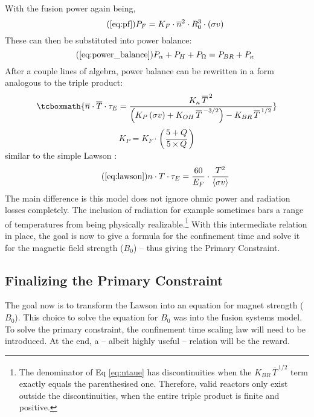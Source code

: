 With the fusion power again being,
\begin{equation}
	\tag{\ref{eq:pf}}
	P_F = K_F \cdot \overline{n}^2 \cdot R_0^3  \cdot (\sigma v)
\end{equation}
These can then be substituted into power balance:
\begin{equation}
	\tag{\ref{eq:power_balance}}
	P_\alpha + P_H + P_\Omega = P_{BR} + P_\kappa
\end{equation}
After a couple lines of algebra, power balance can be rewritten in a form analogous to the triple product:
\begin{equation}
	\label{eq:ntaue}
	\tcboxmath{
	 \overline{n}  \cdot \overline{T} \cdot \tau_E = \frac{ K_\kappa \, \overline{T}^{\,2} }{ \left( K_P \, (\sigma v) +  K_{OH} \, \overline{T}^{  \,-3/2 } \right) - K_{BR} \, \overline{T}^{  \,1/2 } }
	 }
\end{equation}
\begin{equation}
	K_P = K_F \cdot \left( \frac{5 + Q}{5 \times Q} \right)
\end{equation}
 similar to the simple Lawson :
\begin{equation}
	\tag{\ref{eq:lawson}}
	n \cdot T \cdot \tau_E = \frac{ 60 }{ E_F } \cdot \frac{ T ^ 2 }{ \langle \sigma v \rangle }
\end{equation}
The main difference is this model does not ignore ohmic power and radiation losses completely. The inclusion of radiation for example sometimes bars a range of temperatures from being physically realizable.\footnote{The denominator of Eq \ref{eq:ntaue} has discontinuities when the $K_{BR} \, \overline{T}^{  \,1/2 }$ term exactly equals the parenthesised one. Therefore, valid reactors only exist outside the discontinuities, when the entire triple product is finite and positive. } With this intermediate relation in place, the goal is now to give a formula for the confinement time and solve it for the magnetic field strength ($B_0$) -- thus giving the Primary Constraint.

\subsection{Finalizing the Primary Constraint}

The goal now is to transform the Lawson  into an equation for magnet strength ($B_0$). This choice to solve the equation for $B_0$ was  into the fusion systems model. To solve the primary constraint, the confinement time scaling law will need to be introduced. At the end, a  -- albeit highly useful -- relation will be the reward.

